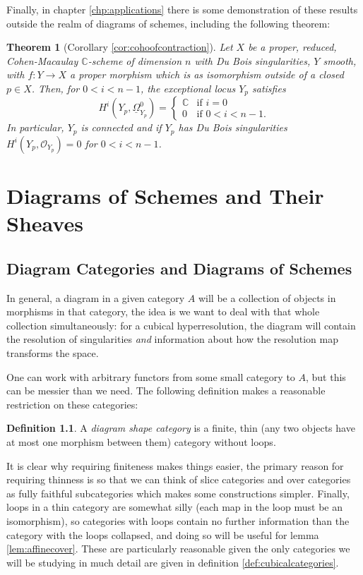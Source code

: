 \documentclass[proquest]{uwthesis}[2014/11/13]
\newtheorem{theorem}{Theorem}[section]
\theoremstyle{definition}
\newtheorem{definition}[theorem]{Definition}
\newcommand{\CC}{\mathbb{C}}
\newcommand{\OO}{\mathcal{O}}
\newcommand{\DB}{\underline{\Omega}}
\begin{document}
Finally, in chapter \ref{chp:applications} there is some demonstration of these results outside the realm of diagrams of schemes, including the following theorem:
\begin{theorem}[Corollary \ref{cor:cohoofcontraction}]
	Let $X$ be a proper, reduced, Cohen-Macaulay $\CC$-scheme of dimension $n$ with Du Bois singularities, $Y$ smooth, with $f : Y \rightarrow X$ a proper morphism which is as isomorphism outside of a closed $p \in X$.
	Then, for $0 < i < n - 1$, the exceptional locus $Y_p$ satisfies
	\[
	H^i (Y_p, \DB_{Y_p}^0) = \begin{cases}
	\CC & \text{if } i = 0 \\
	0 & \text{if } 0 < i < n - 1.
	\end{cases}
	\]
	In particular, $Y_p$ is connected and if $Y_p$ has Du Bois singularities $H^i(Y_p, \OO_{Y_p}) = 0$ for $0 < i < n - 1$.
\end{theorem}



\chapter{Diagrams of Schemes and Their Sheaves}
\label{chp:diagrams}
\section{Diagram Categories and Diagrams of Schemes}
In general, a diagram in a given category $A$ will be a collection of objects in morphisms in that category, the idea is we want to deal with that whole collection simultaneously: for a cubical hyperresolution, the diagram will contain the resolution of singularities \textit{and} information about how the resolution map transforms the space.

One can work with arbitrary functors from some small category to $A$, but this can be messier than we need.
The following definition makes a reasonable restriction on these categories:
\begin{definition}
	A \textit{diagram shape category} is a finite, thin (any two objects have at most one morphism between them) category without loops.
\end{definition}

It is clear why requiring finiteness makes things easier, the primary reason for requiring thinness is so that we can think of slice categories and over categories as fully faithful subcategories which makes some constructions simpler.
Finally, loops in a thin category are somewhat silly (each map in the loop must be an isomorphism), so categories with loops contain no further information than the category with the loops collapsed, and doing so will be useful for lemma \ref{lem:affinecover}.
These are particularly reasonable given the only categories we will be studying in much detail are given in definition \ref{def:cubicalcategories}.
\end{document}
